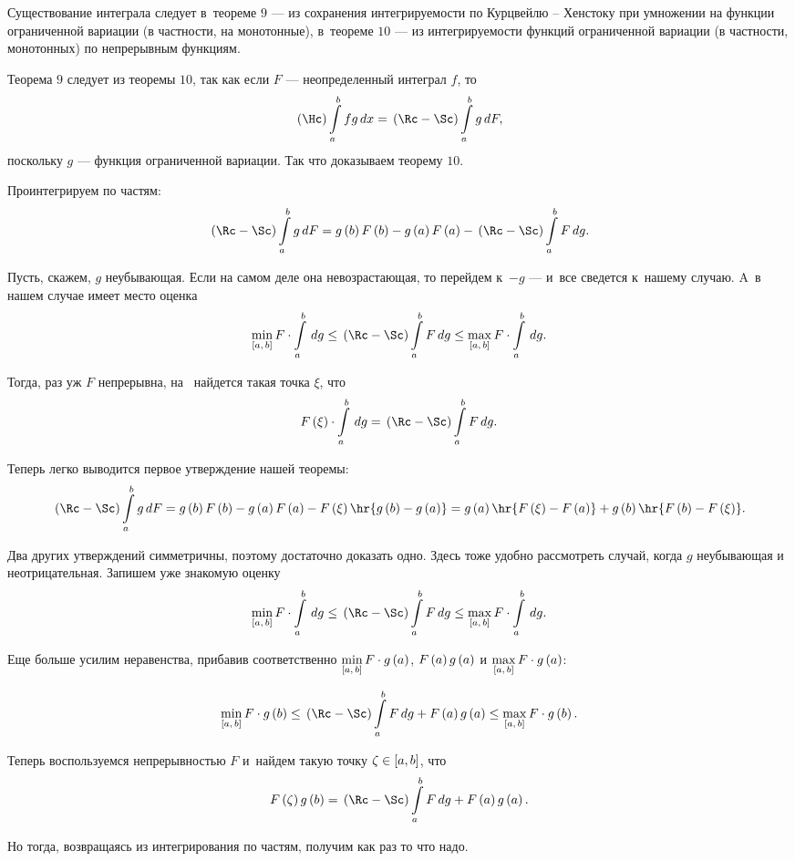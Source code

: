\documentclass[draft]{article}
\begin{document}
Существование интеграла следует в~теореме $9$ --- из сохранения
интегрируемости по Курцвейлю -- Хенстоку при умножении на функции
ограниченной вариации (в частности, на монотонные), в~теореме $10$
--- из интегрируемости функций ограниченной вариации (в частности,
монотонных) по непрерывным функциям.

\smallskip

Теорема $9$ следует из теоремы $10$, так как если $F$ ---
неопределенный интеграл $f$, то
$$\kurzh\intab fg,x=\rimanst\intab g,F,$$
поскольку $g$ --- функция ограниченной вариации. Так что доказываем
теорему $10$.

\smallskip

Проинтегрируем по частям:
$$\rimanst\intab g,F=g\at(b)F\at(b)-g\at(a)F\at(a)-\rimanst\intab
F,g.$$

Пусть, скажем, $g$ неубывающая. Если на самом деле она
невозрастающая, то перейдем к~$-g$ --- и~все сведется к~нашему
случаю. A~в нашем случае имеет место оценка
$$\min_{\seg[a,\,b]}F\cdot\intab ,g\le\rimanst\intab
F,g\le\max_{\seg[a,\,b]}F\cdot\intab ,g.$$

Тогда, раз уж $F$ непрерывна, на \ab\ найдется такая точка $\xi$,
что
$$F\at(\xi)\cdot\intab ,g=\rimanst\intab F,g.$$

Теперь легко выводится первое утверждение нашей теоремы:
$$\rimanst\intab g,F=g\at(b)F\at(b)-g\at(a)F\at(a)-F\at(\xi)\hr{g\at(b)-g\at(a)}=
g\at(a)\hr{F\at(\xi)-F\at(a)}+g\at(b)\hr{F\at(b)-F\at(\xi)}.$$

Два других утверждений симметричны, поэтому достаточно доказать
одно. Здесь тоже удобно рассмотреть случай, когда $g$ неубывающая и
неотрицательная. Запишем уже знакомую оценку
$$\min_{\seg[a,\,b]}F\cdot\intab ,g\le\rimanst\intab
F,g\le\max_{\seg[a,\,b]}F\cdot\intab ,g.$$

Еще больше усилим неравенства, прибавив соответственно
$\min\limits_{\seg[a,\,b]}F\cdot g\at(a)$, $F\at(a)g\at(a)$ и
$\max\limits_{\seg[a,\,b]}F\cdot g\at(a)$:

$$\min_{\seg[a,\,b]}F\cdot g\at(b)\le\rimanst\intab
F,g+F\at(a)g\at(a)\le\max_{\seg[a,\,b]}F\cdot g\at(b).$$

Теперь воспользуемся непрерывностью $F$ и~найдем такую точку
$\zeta\in\segab$, что
$$F\at(\zeta)g\at(b)=\rimanst\intab F,g+F\at(a)g\at(a).$$

Но тогда, возвращаясь из интегрирования по частям, получим как раз
то что надо.

\prtms

\eject
\end{document}
